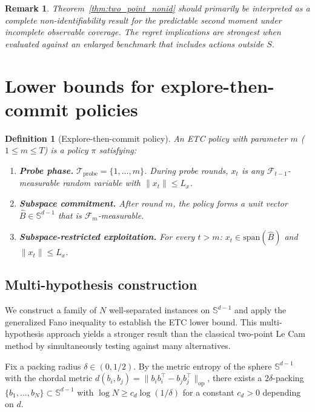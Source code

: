 \documentclass[12pt]{article}
\newcommand{\op}{\mathrm{op}}
\newcommand{\cF}{\mathcal{F}}
\newcommand{\cTprobe}{\mathcal{T}_{\mathrm{probe}}}
\newcommand{\Span}{\mathrm{span}}
\newtheorem{definition}{Definition}
\newtheorem{remark}{Remark}
\theoremstyle{plain}
\theoremstyle{definition}
\begin{document}
\begin{remark}
\label{rem:scope_coverage}
Theorem~\ref{thm:two_point_nonid} should primarily be interpreted as a complete non-identifiability result for the predictable second moment under incomplete observable coverage. The regret implications are strongest when evaluated against an enlarged benchmark that includes actions outside $S$.
\end{remark}


\section{Lower bounds for explore-then-commit policies}
\label{sec:etc_lower_bounds}

\begin{definition}[Explore-then-commit policy]
\label{def:etc}
An \emph{ETC policy with parameter $m$} ($1 \le m \le T$) is a policy $\pi$ satisfying:
\begin{enumerate}[label=(\roman*), nosep]
\item \textbf{Probe phase.} $\cTprobe = \{1, \dots, m\}$. During probe rounds, $x_t$ is any $\cF_{t-1}$-measurable random variable with $\|x_t\| \le L_x$.
\item \textbf{Subspace commitment.} After round $m$, the policy forms a unit vector $\hat{B} \in \mathbb{S}^{d-1}$ that is $\cF_m$-measurable.
\item \textbf{Subspace-restricted exploitation.} For every $t > m$: $x_t \in \Span(\hat{B})$ and $\|x_t\| \le L_x$.
\end{enumerate}
\end{definition}

\subsection{Multi-hypothesis construction}
\label{sec:fano_etc}

We construct a family of $N$ well-separated instances on $\mathbb{S}^{d-1}$ and apply the generalized Fano inequality to establish the ETC lower bound. This multi-hypothesis approach yields a stronger result than the classical two-point Le Cam method by simultaneously testing against many alternatives.

Fix a packing radius $\delta \in (0, 1/2)$. By the metric entropy of the sphere $\mathbb{S}^{d-1}$ with the chordal metric $d(b_i, b_j) = \|b_i b_i^\top - b_j b_j^\top\|_{\op}$, there exists a $2\delta$-packing $\{b_1, \ldots, b_N\} \subset \mathbb{S}^{d-1}$ with $\log N \ge c_d \log(1/\delta)$ for a constant $c_d > 0$ depending on $d$.
\end{document}
